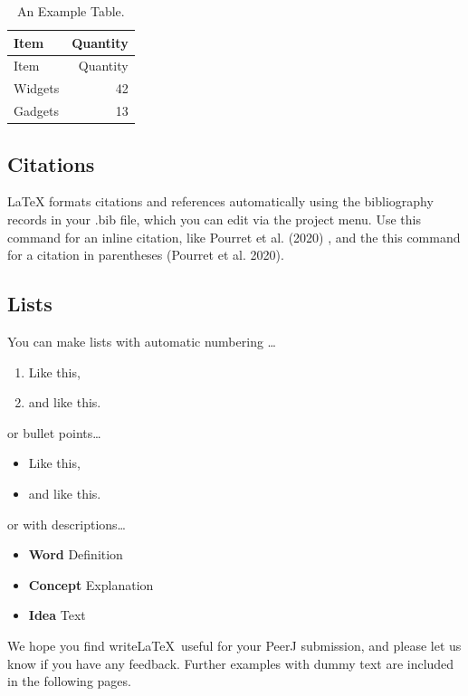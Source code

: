 \documentclass[fleqn,10pt,lineno]{wlpeerj} %
\providecommand{\tightlist}{
\setlength{\itemsep}{0pt}\setlength{\parskip}{0pt}}
\begin{document}
\begin{longtable}[]{@{}lr@{}}
\caption{\label{tab:widgets} An Example Table.}\tabularnewline
\toprule
Item & Quantity\tabularnewline
\midrule
\endfirsthead
\toprule
Item & Quantity\tabularnewline
\midrule
\endhead
Widgets & 42\tabularnewline
Gadgets & 13\tabularnewline
\bottomrule
\end{longtable}

\hypertarget{citations}{%
\subsection*{Citations}\label{citations}}

LaTeX formats citations and references automatically using the bibliography records in your .bib file, which you can edit via the project menu. Use this command for an inline citation, like Pourret et al. (2020) , and the this command for a citation in parentheses (Pourret et al. 2020).

\hypertarget{lists}{%
\subsection*{Lists}\label{lists}}

You can make lists with automatic numbering \dots

\begin{enumerate}
\def\labelenumi{\arabic{enumi}.}
\tightlist
\item
  Like this,
\item
  and like this.
\end{enumerate}

or bullet points\ldots{}

\begin{itemize}
\tightlist
\item
  Like this,
\item
  and like this.
\end{itemize}

or with descriptions\ldots{}

\begin{itemize}
\tightlist
\item
  \textbf{Word} Definition
\item
  \textbf{Concept} Explanation
\item
  \textbf{Idea} Text
\end{itemize}

We hope you find write\LaTeX~useful for your PeerJ submission, and please let us know if you have any feedback. Further examples with dummy text are included in the following pages.
\end{document}
